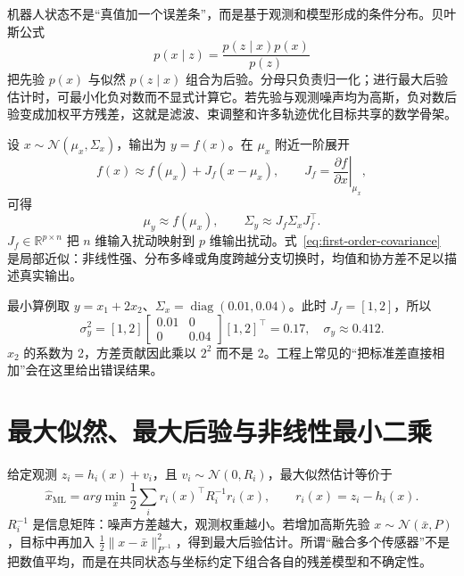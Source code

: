 机器人状态不是“真值加一个误差条”，而是基于观测和模型形成的条件分布。贝叶斯公式
\begin{equation}
p(x\mid z)=\frac{p(z\mid x)p(x)}{p(z)}
\label{eq:bayes-rule}
\end{equation}
把先验 $p(x)$ 与似然 $p(z\mid x)$ 组合为后验。分母只负责归一化；进行最大后验估计时，可最小化负对数而不显式计算它。若先验与观测噪声均为高斯，负对数后验变成加权平方残差，这就是滤波、束调整和许多轨迹优化目标共享的数学骨架\cite{barfoot2024state}。

设 $x\sim\mathcal{N}(\mu_x,\Sigma_x)$，输出为 $y=f(x)$。在 $\mu_x$ 附近一阶展开
\begin{equation}
f(x)\approx f(\mu_x)+J_f(x-\mu_x),\qquad
J_f=\left.\frac{\partial f}{\partial x}\right|_{\mu_x},
\end{equation}
可得
\begin{equation}
\mu_y\approx f(\mu_x),\qquad
\Sigma_y\approx J_f\Sigma_xJ_f^\top.
\label{eq:first-order-covariance}
\end{equation}
$J_f\in\mathbb{R}^{p\times n}$ 把 $n$ 维输入扰动映射到 $p$ 维输出扰动。式~\eqref{eq:first-order-covariance} 是局部近似：非线性强、分布多峰或角度跨越分支切换时，均值和协方差不足以描述真实输出。

最小算例取 $y=x_1+2x_2$、$\Sigma_x=\operatorname{diag}(0.01,0.04)$。此时 $J_f=[1,2]$，所以
\[
\sigma_y^2=[1,2]\begin{bmatrix}0.01&0\\0&0.04\end{bmatrix}[1,2]^\top=0.17,
\quad \sigma_y\approx0.412.
\]
$x_2$ 的系数为 2，方差贡献因此乘以 $2^2$ 而不是 2。工程上常见的“把标准差直接相加”会在这里给出错误结果。

\section{最大似然、最大后验与非线性最小二乘}

给定观测 $z_i=h_i(x)+v_i$，且 $v_i\sim\mathcal{N}(0,R_i)$，最大似然估计等价于
\begin{equation}
\hat{x}_{\mathrm{ML}}=arg\min_x\frac{1}{2}\sum_i
r_i(x)^\top R_i^{-1}r_i(x),\qquad r_i(x)=z_i-h_i(x).
\label{eq:nonlinear-least-squares}
\end{equation}
$R_i^{-1}$ 是信息矩阵：噪声方差越大，观测权重越小。若增加高斯先验 $x\sim\mathcal{N}(\bar{x},P)$，目标中再加入 $\frac12\lVert x-\bar{x}\rVert_{P^{-1}}^2$，得到最大后验估计。所谓“融合多个传感器”不是把数值平均，而是在共同状态与坐标约定下组合各自的残差模型和不确定性。

